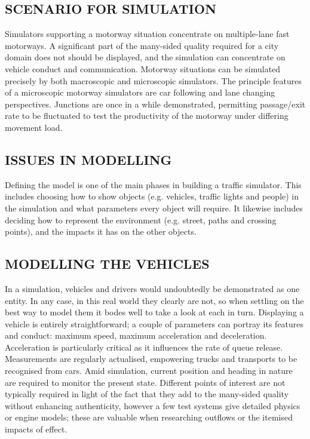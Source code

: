 \documentclass[11pt,a4paper]{article}
\begin{document}
\subsection{SCENARIO FOR SIMULATION}

Simulators supporting a motorway situation concentrate on multiple-lane fast motorways. A significant part of the many-sided quality required for a city domain does not should be displayed, and the simulation can concentrate on vehicle conduct and communication. Motorway situations can be simulated precisely by both macroscopic and microscopic simulators. The principle features of a microscopic motorway simulators are car following and lane changing perspectives. Junctions are once in a while demonstrated, permitting passage/exit rate to be fluctuated to test the productivity of the motorway under differing movement load.


\subsection{ISSUES IN MODELLING}

Defining the model is one of the main phases in building a traffic simulator. This includes choosing how to show objects (e.g. vehicles, traffic lights and people) in the simulation and what parameters every object will require. It likewise includes deciding how to represent the environment (e.g. street, paths and crossing points), and the impacts it has on the other objects.


\subsection{MODELLING THE VEHICLES}

In a simulation, vehicles and drivers would undoubtedly be demonstrated as one entity. In any case, in this real world they clearly are not, so when settling on the best way to model them it bodes well to take a look at each in turn. Displaying a vehicle is entirely straightforward; a couple of parameters can portray its features and conduct: maximum speed, maximum acceleration and deceleration. Acceleration is particularly critical as it influences the rate of queue release. Measurements are regularly actualised, empowering trucks and transports to be recognised from cars. Amid simulation, current position and heading in nature are required to monitor the present state. Different points of interest are not typically required in light of the fact that they add to the many-sided quality without enhancing authenticity, however a few test systems give detailed physics or engine models; these are valuable when researching outflows or the itemised impacts of effect.
\end{document}
